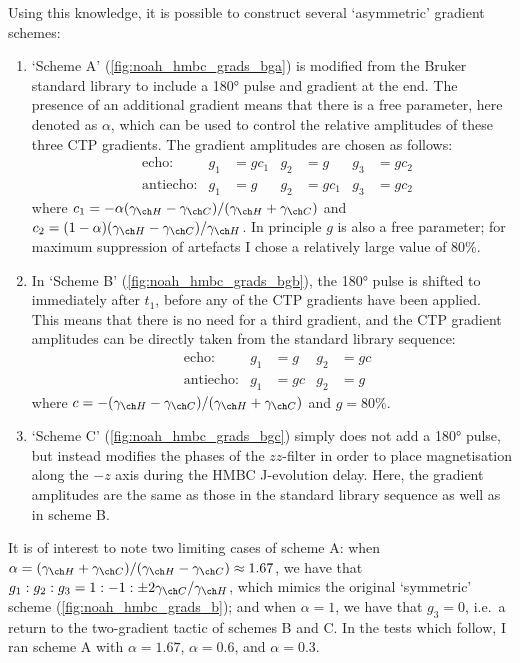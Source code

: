 Using this knowledge, it is possible to construct several `asymmetric' gradient schemes:
\begin{enumerate}
    \item `Scheme A' (\cref{fig:noah_hmbc_grads_bga}) is modified from the Bruker standard library to include a \ang{180} pulse and gradient at the end.
        The presence of an additional gradient means that there is a free parameter, here denoted as $\alpha$, which can be used to control the relative amplitudes of these three CTP gradients.
        The gradient amplitudes are chosen as follows:
        \begin{align}
            &\text{echo:}     & g_1 &= gc_1 & g_2 &= g    & g_3 &= gc_2 \label{eq:noah_hmbc_grads_bga_echo} \\
            &\text{antiecho:} & g_1 &= g    & g_2 &= gc_1 & g_3 &= gc_2 \label{eq:noah_hmbc_grads_bga_antiecho}
        \end{align}
        where $c_1 = -\alpha(\gammaH - \gammaC)/(\gammaH + \gammaC)$ and $c_2 = (1 - \alpha) (\gammaH - \gammaC)/\gammaH$.
        In principle $g$ is also a free parameter; for maximum suppression of artefacts I chose a relatively large value of 80\%.
    \item In `Scheme B' (\cref{fig:noah_hmbc_grads_bgb}), the \ang{180} pulse is shifted to immediately after $t_1$, before any of the CTP gradients have been applied. This means that there is no need for a third gradient, and the CTP gradient amplitudes can be directly taken from the standard library sequence:
        \begin{align}
            &\text{echo:}     & g_1 &= g  & g_2 &= gc \label{eq:noah_hmbc_grads_bgb_echo} \\
            &\text{antiecho:} & g_1 &= gc & g_2 &= g \label{eq:noah_hmbc_grads_bgb_antiecho}
        \end{align}
        where $c = -(\gammaH - \gammaC)/(\gammaH + \gammaC)$ and $g = 80\%$.
    \item `Scheme C' (\cref{fig:noah_hmbc_grads_bgc}) simply does not add a \ang{180} pulse, but instead modifies the phases of the $zz$-filter in order to place  magnetisation along the $-z$ axis during the HMBC J-evolution delay.
        Here, the gradient amplitudes are the same as those in the standard library sequence as well as in scheme B.
\end{enumerate}

It is of interest to note two limiting cases of scheme A: when $\alpha = (\gammaH + \gammaC)/(\gammaH - \gammaC) \approx 1.67$, we have that $g_1 : g_2 : g_3 = 1 : -1 : \pm 2\gammaC/\gammaH$, which mimics the original `symmetric' scheme (\cref{fig:noah_hmbc_grads_b}); and when $\alpha = 1$, we have that $g_3 = 0$, i.e.\ a return to the two-gradient tactic of schemes B and C.
In the tests which follow, I ran scheme A with $\alpha = 1.67$, $\alpha = 0.6$, and $\alpha = 0.3$.


